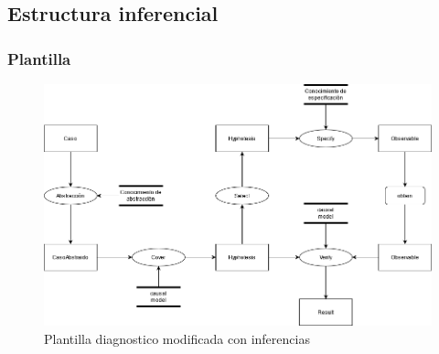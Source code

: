 \subsection{Estructura inferencial}

\subsubsection{Plantilla}
\begin{figure}[H]
  \centering
  \includegraphics[scale=0.50]{imagenes/PlantillaDiagnosticoModificadaInferencia.png}
  \caption{\label{fig:PlantillaDiagnosticoModificadaInferencia}Plantilla diagnostico modificada con inferencias}
\end{figure}

